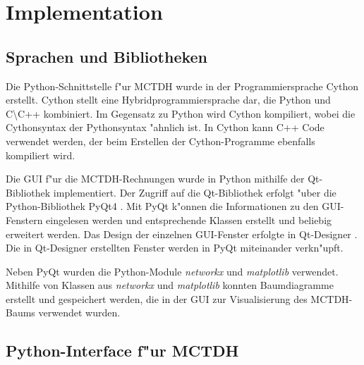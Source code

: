\chapter{Implementation}
\label{cha:Implementation}

\section{Sprachen und Bibliotheken}

Die Python-Schnittstelle f"ur MCTDH wurde in der Programmiersprache Cython \cite{PyArt} erstellt. 
Cython stellt eine Hybridprogrammiersprache dar,
die Python und C\textbackslash C++ kombiniert. Im Gegensatz zu Python
wird Cython kompiliert, wobei die Cythonsyntax der Pythonsyntax "ahnlich ist.
In Cython kann C++ Code verwendet werden, der beim Erstellen der Cython-Programme ebenfalls kompiliert wird.

Die GUI f"ur die MCTDH-Rechnungen wurde in Python mithilfe der Qt-Bibliothek implementiert.
Der Zugriff auf die Qt-Bibliothek \cite{Qt} erfolgt "uber die Python-Bibliothek PyQt4 \cite{PyQt}. 
Mit PyQt k"onnen die Informationen zu den GUI-Fenstern eingelesen werden und entsprechende 
Klassen erstellt und beliebig erweitert werden.
Das Design der einzelnen GUI-Fenster erfolgte in Qt-Designer \cite{Qt-Designer}. 
Die in Qt-Designer erstellten Fenster werden in PyQt miteinander verkn"upft.

Neben PyQt wurden die Python-Module \textit{networkx} \cite{SciPyProceedings_11} und \textit{matplotlib} \cite{Hunter:2007} verwendet.
Mithilfe von Klassen aus \textit{networkx} und \textit{matplotlib} konnten Baumdiagramme erstellt und gespei\-chert werden, die in der GUI zur 
Visualisierung des MCTDH-Baums verwendet wurden.

\section{Python-Interface f"ur MCTDH}
\label{sec:PyInterface}

